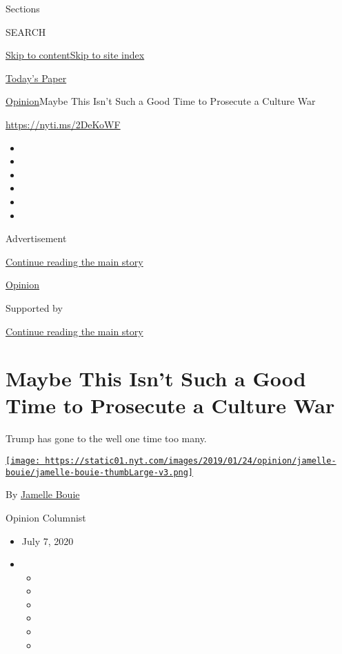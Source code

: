 Sections

SEARCH

\protect\hyperlink{site-content}{Skip to
content}\protect\hyperlink{site-index}{Skip to site index}

\href{https://myaccount.nytimes.com/auth/login?response_type=cookie\&client_id=vi}{}

\href{https://www.nytimes.com/section/todayspaper}{Today's Paper}

\href{/section/opinion}{Opinion}\textbar{}Maybe This Isn't Such a Good
Time to Prosecute a Culture War

\href{https://nyti.ms/2DeKoWF}{https://nyti.ms/2DeKoWF}

\begin{itemize}
\item
\item
\item
\item
\item
\item
\end{itemize}

Advertisement

\protect\hyperlink{after-top}{Continue reading the main story}

\href{/section/opinion}{Opinion}

Supported by

\protect\hyperlink{after-sponsor}{Continue reading the main story}

\hypertarget{maybe-this-isnt-such-a-good-time-to-prosecute-a-culture-war}{%
\section{Maybe This Isn't Such a Good Time to Prosecute a Culture
War}\label{maybe-this-isnt-such-a-good-time-to-prosecute-a-culture-war}}

Trump has gone to the well one time too many.

\href{https://www.nytimes.com/column/jamelle-bouie}{\texttt{[image: https://static01.nyt.com/images/2019/01/24/opinion/jamelle-bouie/jamelle-bouie-thumbLarge-v3.png]}}

By \href{https://www.nytimes.com/column/jamelle-bouie}{Jamelle Bouie}

Opinion Columnist

\begin{itemize}
\item
  July 7, 2020
\item
  \begin{itemize}
  \item
  \item
  \item
  \item
  \item
  \item
  \end{itemize}
\end{itemize}

